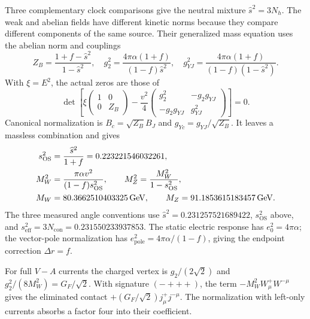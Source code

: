 \documentclass[aps,prx,onecolumn,10pt,notitlepage,nofootinbib,longbibliography]{revtex4-2}
\numberwithin{equation}{section}
\numberwithin{table}{section}
\newcommand{\GeV}{\,\mathrm{GeV}}
\begin{document}
Three complementary clock comparisons give the neutral mixture $\widehat s^2=3N_h$. The weak and abelian fields have different kinetic norms because they compare different components of the same source. Their generalized mass equation uses the abelian norm and couplings
\begin{equation}
 Z_B=\frac{1+f-\widehat s^2}{1-\widehat s^2},\quad
 g_2^2=\frac{4\pi\alpha(1+f)}{(1-f)\widehat s^2},\quad
 g_{YJ}^2=\frac{4\pi\alpha(1+f)}{(1-f)(1-\widehat s^2)}.
 \label{eq:weak_coefficients}
\end{equation}
With $\xi=E^2$, the actual zeros are those of
\begin{equation}
 \det\left[
 \xi\begin{pmatrix}1&0\\0&Z_B\end{pmatrix}
 -\frac{v^2}{4}
 \begin{pmatrix}g_2^2&-g_2g_{YJ}\\-g_2g_{YJ}&g_{YJ}^2\end{pmatrix}
 \right]=0.
 \label{eq:weakpencil}
\end{equation}
Canonical normalization is $B_c=\sqrt{Z_B}B_J$ and $g_{Yc}=g_{YJ}/\sqrt{Z_B}$. It leaves a massless combination and gives
\begin{align}
 s_{\mathrm{OS}}^2&=\frac{\widehat s^2}{1+f}=0.223221546032261,\notag\\
 M_W^2&=\frac{\pi\alpha v^2}{(1-f)s_{\mathrm{OS}}^2},\qquad
 M_Z^2=\frac{M_W^2}{1-s_{\mathrm{OS}}^2},\notag\\
 M_W&=80.3662510403325\GeV,\qquad
 M_Z=91.1853615183457\GeV.
 \label{eq:weakmasses}
\end{align}
The three measured angle conventions use $\widehat s^2=0.231257521689422$, $s_{\mathrm{OS}}^2$ above, and $s_{\mathrm{eff}}^2=3N_{\mathrm{con}}=0.231550233937853$. The static electric response has $e_0^2=4\pi\alpha$; the vector-pole normalization has $e_{\mathrm{pole}}^2=4\pi\alpha/(1-f)$, giving the endpoint correction $\Delta r=f$.

For full $V-A$ currents the charged vertex is $g_2/(2\sqrt2)$ and $g_2^2/(8M_W^2)=G_F/\sqrt2$. With signature $(-+++)$, the term $-M_W^2W^+_\mu W^{-\mu}$ gives the eliminated contact $+(G_F/\sqrt2)j^+_\mu j^{-\mu}$. The normalization with left-only currents absorbs a factor four into their coefficient.
\end{document}
